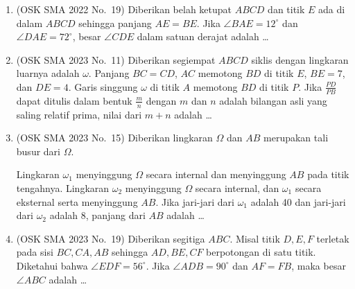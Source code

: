 \documentclass[12pt,a4paper]{article}
\begin{document}
\begin{enumerate}
\item (OSK SMA 2022 No.\ 19) Diberikan belah ketupat $ABCD$ dan titik $E$ ada di dalam $ABCD$ sehingga panjang $AE=BE$. Jika $\angle BAE=12^{\circ}$ dan $\angle DAE=72^{\circ}$, besar $\angle CDE$ dalam satuan derajat adalah \dots

\item (OSK SMA 2023 No.\ 11) Diberikan segiempat $ABCD$ siklis dengan lingkaran luarnya adalah $\omega$. Panjang $BC = CD$, $AC$ memotong $BD$ di titik $E$, $BE=7$, dan $DE=4$. Garis singgung $\omega$ di titik $A$ memotong $BD$ di titik $P$. Jika $\frac{PD}{PB}$ dapat ditulis dalam bentuk $\frac{m}{n}$ dengan $m$ dan $n$ adalah bilangan asli yang saling relatif prima, nilai dari $m+n$ adalah \dots

\item (OSK SMA 2023 No.\ 15) Diberikan lingkaran $\Omega$ dan $AB$ merupakan tali busur dari $\Omega$.

\begin{center}
\end{center}

Lingkaran $\omega_{1}$ menyinggung $\Omega$ secara internal dan menyinggung $AB$ pada titik tengahnya. Lingkaran $\omega_{2}$ menyinggung $\Omega$ secara internal, dan $\omega_{1}$ secara eksternal serta menyinggung $AB$. Jika jari-jari dari $\omega_{1}$ adalah 40 dan jari-jari dari $\omega_{2}$ adalah 8, panjang dari $AB$ adalah \dots

\item (OSK SMA 2023 No.\ 19) Diberikan segitiga $ABC$. Misal titik $D, E, F$ terletak pada sisi $BC, CA, AB$ sehingga $AD, BE, CF$ berpotongan di satu titik. Diketahui bahwa $\angle EDF=56^{\circ}$. Jika $\angle ADB=90^{\circ}$ dan $AF=FB$, maka besar $\angle ABC$ adalah \dots


\end{enumerate}
\end{document}
